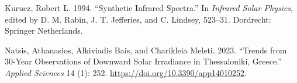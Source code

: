 \documentclass[
]{article}
\newlength{\cslhangindent}
\newlength{\cslentryspacingunit} %
\newenvironment{CSLReferences}[2] %
 {%
  \setlength{\parindent}{0pt}
  \ifodd #1
  \let\oldpar\par
  \def\par{\hangindent=\cslhangindent\oldpar}
  \fi
  \setlength{\parskip}{#2\cslentryspacingunit}
 }%
 {}
\begin{document}
\begin{CSLReferences}{1}{0}
\leavevmode{}%
Kurucz, Robert L. 1994. {``Synthetic Infrared Spectra.''} In \emph{Infrared Solar Physics}, edited by D. M. Rabin, J. T. Jefferies, and C. Lindsey, 523--31. Dordrecht: Springer Netherlands.

\leavevmode{}%
Natsis, Athanasios, Alkiviadis Bais, and Charikleia Meleti. 2023. {``Trends from 30-Year Observations of Downward Solar Irradiance in Thessaloniki, Greece.''} \emph{Applied Sciences} 14 (1): 252. \url{https://doi.org/10.3390/app14010252}.

\end{CSLReferences}
\end{document}
